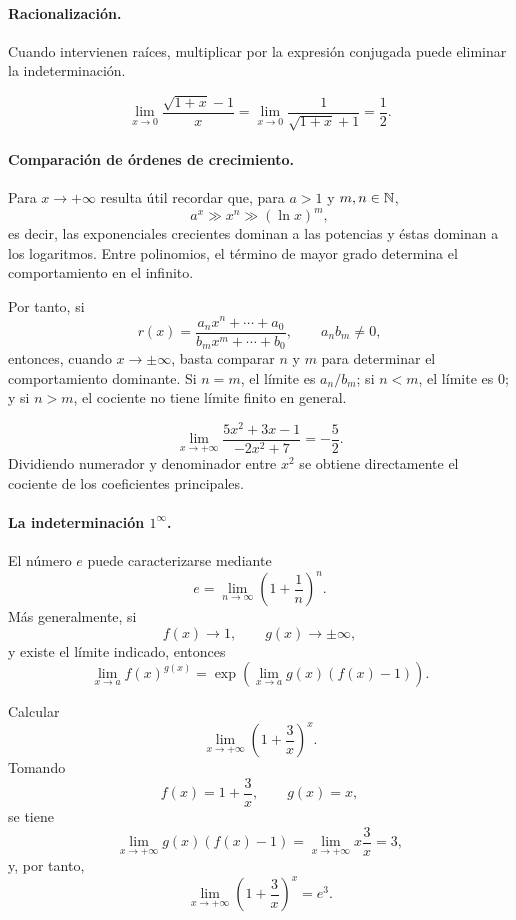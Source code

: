 \paragraph{Racionalización.}
Cuando intervienen raíces, multiplicar por la expresión conjugada puede eliminar la indeterminación.

\begin{example}
\[
\lim_{x\to0}\frac{\sqrt{1+x}-1}{x}
=\lim_{x\to0}
\frac{1}{\sqrt{1+x}+1}
=\frac12.
\]
\end{example}

\paragraph{Comparación de órdenes de crecimiento.}
Para $x\to+\infty$ resulta útil recordar que, para $a>1$ y $m,n\in\mathbb{N}$,
\[
a^x\gg x^n\gg (\ln x)^m,
\]
es decir, las exponenciales crecientes dominan a las potencias y éstas dominan a los logaritmos. Entre polinomios, el término de mayor grado determina el comportamiento en el infinito.

Por tanto, si
\[
r(x)=\frac{a_nx^n+\cdots+a_0}{b_mx^m+\cdots+b_0},
\qquad a_n b_m\neq0,
\]
entonces, cuando $x\to\pm\infty$, basta comparar $n$ y $m$ para determinar el comportamiento dominante. Si $n=m$, el límite es $a_n/b_m$; si $n<m$, el límite es $0$; y si $n>m$, el cociente no tiene límite finito en general.

\begin{example}
\[
\lim_{x\to+\infty}\frac{5x^2+3x-1}{-2x^2+7}
=-\frac52.
\]
Dividiendo numerador y denominador entre $x^2$ se obtiene directamente el cociente de los coeficientes principales.
\end{example}

\paragraph{La indeterminación $1^\infty$.}
El número $e$ puede caracterizarse mediante
\[
e=\lim_{n\to\infty}\left(1+\frac1n\right)^n.
\]
Más generalmente, si
\[
f(x)\to1,
\qquad
g(x)\to\pm\infty,
\]
y existe el límite indicado, entonces
\[
\lim_{x\to a}f(x)^{g(x)}
=
\exp\left(\lim_{x\to a}g(x)(f(x)-1)\right).
\]

\begin{example}
Calcular
\[
\lim_{x\to+\infty}\left(1+\frac{3}{x}\right)^x.
\]
Tomando
\[
f(x)=1+\frac3x,
\qquad g(x)=x,
\]
se tiene
\[
\lim_{x\to+\infty}g(x)(f(x)-1)
=\lim_{x\to+\infty}x\frac3x=3,
\]
y, por tanto,
\[
\lim_{x\to+\infty}\left(1+\frac3x\right)^x=e^3.
\]
\end{example}

